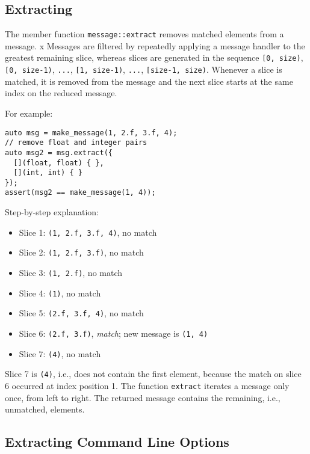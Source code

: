 \clearpage
\subsection{Extracting}
\label{Sec::Messages::Extract}

The member function \lstinline^message::extract^ removes matched elements from a message. x
Messages are filtered by repeatedly applying a message handler to the greatest remaining slice, whereas slices are generated in the sequence \lstinline^[0, size)^, \lstinline^[0, size-1)^, \lstinline^...^, \lstinline^[1, size-1)^, \lstinline^...^, \lstinline^[size-1, size)^.
Whenever a slice is matched, it is removed from the message and the next slice starts at the same index on the reduced message.

For example:

\begin{lstlisting}
auto msg = make_message(1, 2.f, 3.f, 4);
// remove float and integer pairs
auto msg2 = msg.extract({
  [](float, float) { },
  [](int, int) { }
});
assert(msg2 == make_message(1, 4));
\end{lstlisting}

Step-by-step explanation:

\begin{itemize}
  \item Slice 1: \lstinline^(1, 2.f, 3.f, 4)^, no match
  \item Slice 2: \lstinline^(1, 2.f, 3.f)^, no match
  \item Slice 3: \lstinline^(1, 2.f)^, no match
  \item Slice 4: \lstinline^(1)^, no match
  \item Slice 5: \lstinline^(2.f, 3.f, 4)^, no match
  \item Slice 6: \lstinline^(2.f, 3.f)^, \emph{match}; new message is \lstinline^(1, 4)^
  \item Slice 7: \lstinline^(4)^, no match
\end{itemize}

Slice 7 is \lstinline^(4)^, i.e., does not contain the first element, because the match on slice 6 occurred at index position 1. The function \lstinline^extract^ iterates a message only once, from left to right.
The returned message contains the remaining, i.e., unmatched, elements.

\clearpage
\subsection{Extracting Command Line Options}
\label{Sec::Messages::ExtractOpts}

